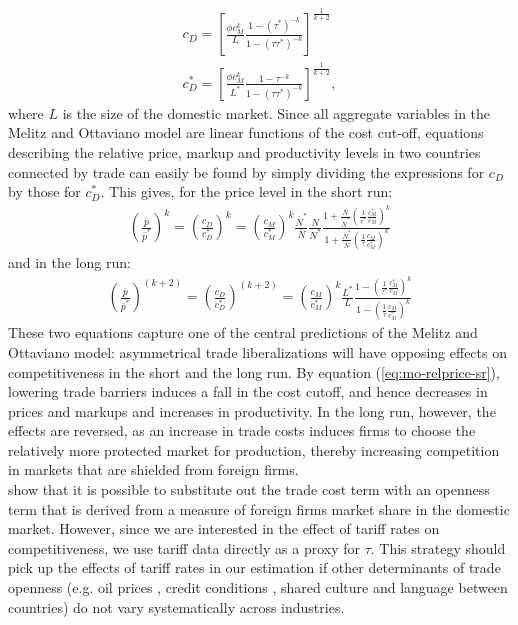 \begin{align}
c_D = \left[ \frac{\phi c_M^k}{L} \frac{1-(\tau^*)^{-k}}{1-(\tau\tau^{*})^{-k}} \right]^{\frac{1}{k+2}} \\
c_D^* = \left[ \frac{\phi c_M^k}{L^*} \frac{1-\tau^{-k}}{1-(\tau\tau^{*})^{-k}} \right]^{\frac{1}{k+2}},
\end{align}
where $L$ is the size of the domestic market. Since all aggregate variables in the Melitz and Ottaviano model are linear functions of the cost cut-off, equations describing the relative price, markup and productivity levels in two countries connected by trade can easily be found by simply dividing the expressions for $c_D$ by those for $c_D^*$. This gives, for the price level in the short run:
\begin{align}
\left( \frac{\bar{p}}{\bar{p}^*} \right)^k = \left( \frac{c_D}{c_D^*} \right)^k = \left(\frac{c_M}{c_M^*} \right)^k \frac{\bar{N}^*}{\bar{N}} \frac{N}{N^*} \frac{1 + \frac{\bar{N}}{\bar{N}^*} \left(\frac{1}{\tau^*} \frac{c_M^*}{c_M} \right)^k}{1 + \frac{\bar{N}^*}{\bar{N}} \left(\frac{1}{\tau} \frac{c_M}{c_M^*} \right)^k} \label{eq:mo-relprice-sr}
\end{align}
and in the long run: 
\begin{align}
\left( \frac{\bar{p}}{\bar{p}^*} \right)^{(k+2)} = \left( \frac{c_D}{c_D^*} \right)^{(k+2)} = \left( \frac{c_M}{c_M^*} \right)^k \frac{L^*}{L} \frac{1- \left(\frac{1}{\tau^*} \frac{c_M^*}{c_M}\right)^k}{1 - \left(\frac{1}{\tau}\frac{c_M}{c_M^*}\right)^k} \label{eq:mo-relprice-lr}
\end{align}
These two equations capture one of the central predictions of the Melitz and Ottaviano model: asymmetrical trade liberalizations will have opposing effects on competitiveness in the short and the long run. By equation (\ref{eq:mo-relprice-sr}), lowering trade barriers induces a fall in the cost cutoff, and hence decreases in prices and markups and increases in productivity. In the long run, however, the effects are reversed, as an increase in trade costs induces firms to choose the relatively more protected market for production, thereby increasing competition in markets that are shielded from foreign firms. \\
\citet{Chen2009} show that it is possible to substitute out the trade cost term with an openness term that is derived from a measure of foreign firms market share in the domestic market. However, since we are interested in the effect of tariff rates on competitiveness, we use tariff data directly as a proxy for $\tau$. This strategy should pick up the effects of tariff rates in our estimation if other determinants of trade openness (e.g. oil prices \citep{Kilian2009}, credit conditions \citep{Chor2012}, shared culture and language between countries) do not vary systematically across industries. \\
